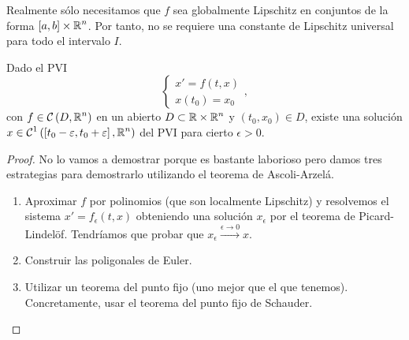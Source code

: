 \begin{observation}
	Realmente sólo necesitamos que $\displaystyle f $ sea globalmente Lipschitz en conjuntos de la forma $\displaystyle \left[a,b\right] \times \mathbb{R}^{n} $. Por tanto, no se requiere una constante de Lipschitz universal para todo el intervalo $\displaystyle I $.  
\end{observation}

\begin{theorem}
	Dado el PVI
	\[
	\begin{cases}
	x'= f\left(t,x\right)\\
	x\left(t_{0}\right)=x_{0}
	\end{cases}
	,\]
	con $\displaystyle f \in \mathcal{C}\left(D, \mathbb{R}^{n}\right) $ en un abierto $\displaystyle D \subset \mathbb{R}\times \mathbb{R}^{n} $ y $\displaystyle \left(t_{0}, x_{0}\right) \in D $, existe una solución $\displaystyle x \in \mathcal{C}^{1}\left(\left[t_{0}-\varepsilon, t_{0} + \varepsilon \right] , \mathbb{R}^{n}\right) $ del PVI para cierto $\displaystyle \epsilon > 0 $. 
\end{theorem}
\begin{proof}
No lo vamos a demostrar porque es bastante laborioso pero damos tres estrategias para demostrarlo utilizando el teorema de Ascoli-Arzelá. 
\begin{enumerate}
	\item Aproximar $\displaystyle f $ por polinomios (que son localmente Lipschitz) y resolvemos el sistema $\displaystyle x' = f_{\epsilon }\left(t,x\right) $ obteniendo una solución $\displaystyle x_{\epsilon } $ por el teorema de Picard-Lindelöf. Tendríamos que probar que $\displaystyle x_{\epsilon } \xrightarrow{\epsilon \to 0} x$. 
	\item Construir las poligonales de Euler. 
	\item Utilizar un teorema del punto fijo (uno mejor que el que tenemos). Concretamente, usar el teorema del punto fijo de Schauder.
\end{enumerate}
\end{proof}


